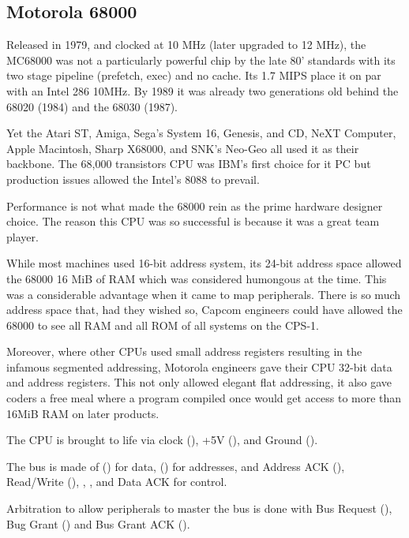\subsection{Motorola 68000}

 Released in 1979, and clocked at 10 MHz (later upgraded to 12 MHz), the MC68000 was not a particularly powerful chip by the late 80' standards with its two stage pipeline\cite{M68000fv} (prefetch, exec) and no cache. Its 1.7 MIPS place it on par with an Intel 286 10MHz. By 1989 it was already two generations old behind the 68020 (1984) and the 68030 (1987).

Yet the Atari ST, Amiga, Sega's System 16, Genesis, and CD, NeXT Computer, Apple Macintosh, Sharp X68000, and SNK's Neo-Geo all used it as their backbone. The 68,000 transistors CPU was IBM's first choice for it PC but production issues allowed the Intel's 8088 to prevail\cite{ieee20170630}. 

Performance is not what made the 68000 rein as the prime hardware designer choice. The reason this CPU was so successful is because it was a great team player.

While most machines used 16-bit address system, its 24-bit address space allowed the 68000 16 MiB of RAM which was considered humongous at the time. This was a considerable advantage when it came to map peripherals. There is so much address space that, had they wished so, Capcom engineers could have allowed the 68000 to see all RAM and all ROM of all systems on the CPS-1.

Moreover, where other CPUs used small address registers resulting in the infamous segmented addressing, Motorola engineers gave their CPU 32-bit data and address registers. This not only allowed elegant flat addressing, it also gave coders a free meal where a program compiled once would get access to more than 16MiB RAM on later products. 





The CPU is brought to life via clock (), +5V (), and Ground ().

The bus is made of () for data, (\icode{A1-A23]}) for addresses, and Address ACK (), Read/Write (), , , and Data ACK  for control.


Arbitration to allow peripherals to master the bus is done with Bus Request (),  Bug Grant () and Bus Grant ACK ().

